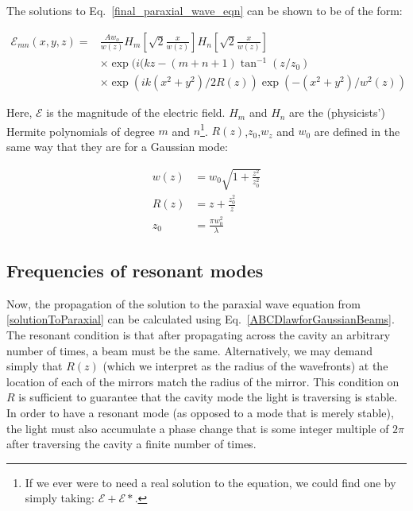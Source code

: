 The solutions to Eq.\ \ref{final_paraxial_wave_eqn} can be shown to be of the form:

\begin{align} \label{solutionToParaxial}
\mathcal{E}_{mn}(x,y,z)=&\frac{Aw_o}{w(z)}H_m\left[\sqrt{2}\frac{x}{w(z)}\right]H_n\left[\sqrt{2}\frac{x}{w(z)}\right] \\
&\times \exp(i(kz-(m+n+1)\tan^{-1}(z/z_0)\\
&\times \exp(ik(x^2+y^2)/2R(z)) \exp(-(x^2+y^2)/w^2(z))
\end{align}

Here, $\mathcal{E}$ is the magnitude of the electric field. $H_m$ and $H_n$ are the (physicists') Hermite polynomials of degree $m$ and $n$\footnote{If we ever were to need a real solution to the equation, we could find one by simply taking: $\mathcal{E}+\mathcal{E}*$.}. $R(z)$,$z_0$,$w_z$ and $w_0$ are defined in the same way that they are for a Gaussian mode:

\begin{align}
w(z)&=w_0 \sqrt{1+\frac{z^2}{z_0^2}} \\
R(z)&=z+\frac{z_0^2}{z}\\
z_0&=\frac{\pi w_0^2}{\lambda }
\end{align}


\subsection{Frequencies of resonant modes}
Now, the propagation of the solution to the paraxial wave equation from \ref{solutionToParaxial} can be calculated using Eq.\ \ref{ABCDlawforGaussianBeams}. The resonant condition is that after propagating across the cavity an arbitrary number of times, a beam must be the same\cite{lasersMilonniEberly}.
Alternatively, we may demand simply that $R(z)$ (which we interpret as the radius of the wavefronts) at the location of each of the mirrors match the radius of the mirror. This condition on $R$ is sufficient to guarantee that the cavity mode the light is traversing is stable. In order to have a resonant mode (as opposed to a mode that is merely stable), the light must also accumulate a phase change that is some integer multiple of $2\pi$ after traversing the cavity a finite number of times.

